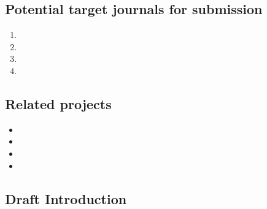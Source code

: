 \documentclass[10pt,letterpaper]{article}
\newcommand{\be}{\begin{enumerate}}
\newcommand{\ee}{\end{enumerate}}
\begin{document}
\subsection{Potential target journals for submission}
\label{sub:target-journals}

\be
  \item 
  \item
  \item
  \item
\ee


\subsection{Related projects}
\label{sub:related-projects}


\begin{itemize}
  \item
  \item 
  \item 
  \item 
\end{itemize}

\subsection{Draft Introduction}
\label{subsec:Introduction}


\end{document}
